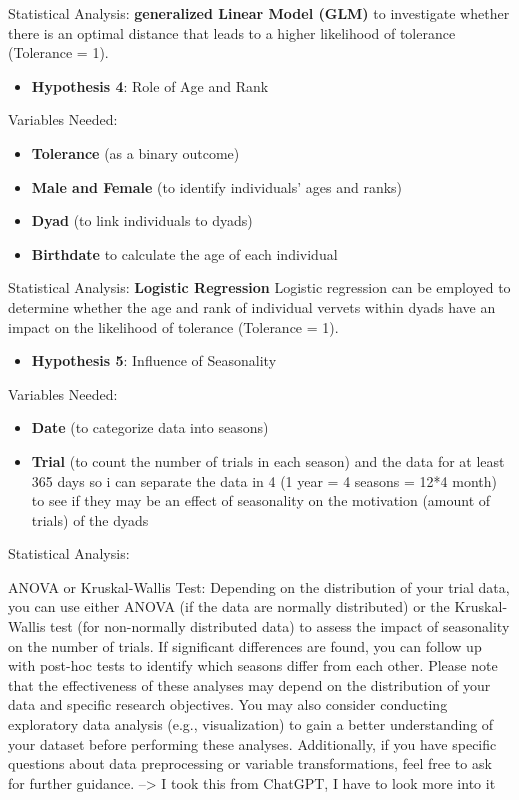 \documentclass[
]{article}
\providecommand{\tightlist}{%
  \setlength{\itemsep}{0pt}\setlength{\parskip}{0pt}}
\begin{document}
Statistical Analysis: \textbf{generalized Linear Model (GLM)} to
investigate whether there is an optimal distance that leads to a higher
likelihood of tolerance (Tolerance = 1).

\begin{itemize}
\tightlist
\item
  \textbf{Hypothesis 4}: Role of Age and Rank
\end{itemize}

Variables Needed:

\begin{itemize}
\tightlist
\item
  \textbf{Tolerance} (as a binary outcome)
\item
  \textbf{Male and Female} (to identify individuals' ages and ranks)
\item
  \textbf{Dyad} (to link individuals to dyads)
\item
  \textbf{Birthdate} to calculate the age of each individual
\end{itemize}

Statistical Analysis: \textbf{Logistic Regression} Logistic regression
can be employed to determine whether the age and rank of individual
vervets within dyads have an impact on the likelihood of tolerance
(Tolerance = 1).

\begin{itemize}
\tightlist
\item
  \textbf{Hypothesis 5}: Influence of Seasonality
\end{itemize}

Variables Needed:

\begin{itemize}
\tightlist
\item
  \textbf{Date} (to categorize data into seasons)
\item
  \textbf{Trial} (to count the number of trials in each season) and the
  data for at least 365 days so i can separate the data in 4 (1 year = 4
  seasons = 12*4 month) to see if they may be an effect of seasonality
  on the motivation (amount of trials) of the dyads
\end{itemize}

Statistical Analysis:

ANOVA or Kruskal-Wallis Test: Depending on the distribution of your
trial data, you can use either ANOVA (if the data are normally
distributed) or the Kruskal-Wallis test (for non-normally distributed
data) to assess the impact of seasonality on the number of trials. If
significant differences are found, you can follow up with post-hoc tests
to identify which seasons differ from each other. Please note that the
effectiveness of these analyses may depend on the distribution of your
data and specific research objectives. You may also consider conducting
exploratory data analysis (e.g., visualization) to gain a better
understanding of your dataset before performing these analyses.
Additionally, if you have specific questions about data preprocessing or
variable transformations, feel free to ask for further guidance.
--\textgreater{} I took this from ChatGPT, I have to look more into it
\end{document}
